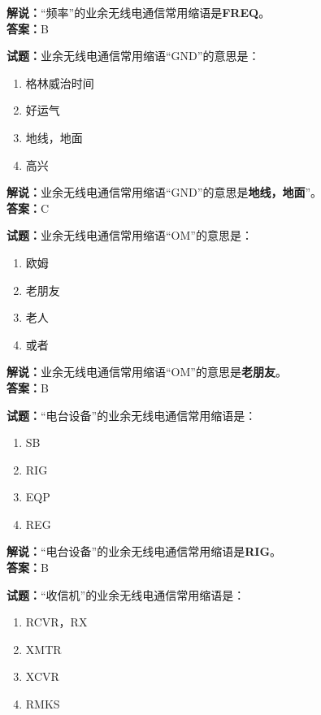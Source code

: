 \documentclass{ctexbook}
\begin{document}
\noindent\textbf{解说：}“频率”的业余无线电通信常用缩语是\textbf{FREQ}。\\\noindent\textbf{答案：}B

\bigskip


\noindent\textbf{试题：}业余无线电通信常用缩语“GND”的意思是：

\begin{enumerate}[leftmargin=3em]
	\item 格林威治时间
	\item 好运气
	\item 地线，地面
	\item 高兴
\end{enumerate}

\noindent\textbf{解说：}业余无线电通信常用缩语“GND”的意思是\textbf{地线，地面}”。\\\noindent\textbf{答案：}C


\bigskip


\noindent\textbf{试题：}业余无线电通信常用缩语“OM”的意思是：

\begin{enumerate}[leftmargin=3em]
	\item 欧姆
	\item 老朋友
	\item 老人
	\item 或者
\end{enumerate}

\noindent\textbf{解说：}业余无线电通信常用缩语“OM”的意思是\textbf{老朋友}。\\\noindent\textbf{答案：}B


\bigskip


\noindent\textbf{试题：}“电台设备”的业余无线电通信常用缩语是：

\begin{enumerate}[leftmargin=3em]
	\item SB
	\item RIG
	\item EQP
	\item REG
\end{enumerate}

\noindent\textbf{解说：}“电台设备”的业余无线电通信常用缩语是\textbf{RIG}。\\\noindent\textbf{答案：}B


\bigskip


\noindent\textbf{试题：}“收信机”的业余无线电通信常用缩语是：

\begin{enumerate}[leftmargin=3em]
	\item RCVR，RX
	\item XMTR
	\item XCVR
	\item RMKS
\end{enumerate}
\end{document}
